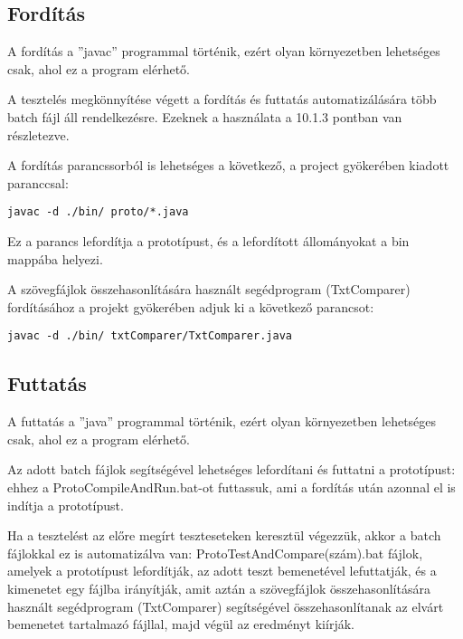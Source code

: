 \lstset{escapeinside=`', xleftmargin=10pt, frame=single, basicstyle=\ttfamily\footnotesize, language=sh}

\subsection{Fordítás}

A fordítás a ''javac'' programmal történik, ezért olyan környezetben lehetséges csak, ahol ez a program elérhető. 

A tesztelés megkönnyítése végett a fordítás és futtatás automatizálására több batch fájl áll rendelkezésre. Ezeknek a használata a 10.1.3 pontban van részletezve. 

A fordítás parancssorból is lehetséges a következő, a project gyökerében kiadott paranccsal:
\begin{lstlisting}
javac -d ./bin/ proto/*.java
\end{lstlisting}
Ez a parancs lefordítja a prototípust, és a lefordított állományokat a bin mappába helyezi.  

A szövegfájlok összehasonlítására használt segédprogram (TxtComparer) fordításához a projekt gyökerében adjuk ki a következő parancsot:
\begin{lstlisting}
javac -d ./bin/ txtComparer/TxtComparer.java
\end{lstlisting}

\subsection{Futtatás}

A futtatás a ''java'' programmal történik, ezért olyan környezetben lehetséges csak, ahol ez a program elérhető. 

Az adott batch fájlok segítségével lehetséges lefordítani és futtatni a prototípust: ehhez a ProtoCompileAndRun.bat-ot futtassuk, ami a fordítás után azonnal el is indítja a prototípust.

Ha a tesztelést az előre megírt teszteseteken keresztül végezzük, akkor a batch fájlokkal ez is automatizálva van: ProtoTestAndCompare(szám).bat fájlok, amelyek a prototípust lefordítják, az adott teszt bemenetével lefuttatják, és a kimenetet egy fájlba irányítják, amit aztán a szövegfájlok összehasonlítására használt segédprogram (TxtComparer) segítségével összehasonlítanak az elvárt bemenetet tartalmazó fájllal, majd végül az eredményt kiírják.

